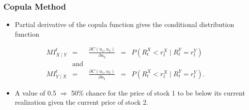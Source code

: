 \documentclass[pdf,10pt,xcolor=dvipsnames,hide notes]{beamer}
\begin{document}
\begin{frame}[label=frame4f]
	\frametitle{Copula Method}
	
		
	\begin{itemize}
		\item<1> Partial derivative of the copula function gives the conditional distribution function 
		
		
\end{itemize}
	
	
		\begin{equation}
		\begin{aligned}
		MI_{X\mid Y}^{t}& = &\frac{\partial C(u_{1},u_{2})}{\partial u_{2}} & = & P(R_{t}^{X}<r_{t}^{X}\mid R_{t}^{Y}=r_{t}^{Y}) \\
		& \text{and} & \\
		MI_{Y\mid X}^{t}& = &\frac{\partial C(u_{1},u_{2})}{\partial u_{1}}& = & P(R_{t}^{X}<r_{t}^{X}\mid R_{t}^{Y}=r_{t}^{Y}).
		\end{aligned}
		\label{eq:eq31}
		\end{equation}
		
		\pause
		\vspace{0.3cm}
		
			\begin{itemize}
			\justifying
			\item A value of 0.5 $\Rightarrow$ 50\% chance for the price of stock 1 to be below its current realization given the current price of stock 2.
			\vspace{0.1cm}
			\end{itemize}
		
\end{frame}
\end{document}
